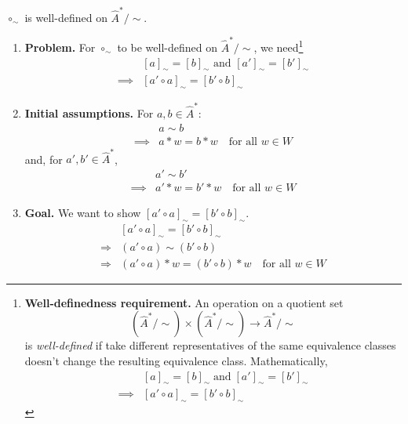 \begin{propositionE}
    \label{prp:circ_sim_well_defined}
    $\circ_{\sim}$ is well-defined on $\hat{A}^{*}/\sim$.
\end{propositionE}
\begin{proofE}
\begin{enumerate}
    \item \textbf{Problem.}
    For $\circ_{\sim}$ to be well-defined on $\hat{A}^{*}/\sim$, we need\footnote{
        \textbf{Well-definedness requirement.}
        An operation on a quotient set
        \begin{equation}
            (\hat{A}^{*}/\sim) \times (\hat{A}^{*}/\sim) \to \hat{A}^{*}/\sim
        \end{equation}
        is \emph{well-defined} if take different representatives of the same equivalence classes doesn't change the resulting equivalence class.
        Mathematically,
        \begin{equation}
        \begin{aligned}
            & [a]_{\sim} = [b]_{\sim} \; \text{and} \; [a']_{\sim} = [b']_{\sim} \\
            \implies & [a' \circ a]_{\sim} = [b' \circ b]_{\sim}
        \end{aligned}
        \end{equation}
    }
    \begin{equation}
    \begin{aligned}
        & [a]_{\sim} = [b]_{\sim} \text{ and } [a']_{\sim} = [b']_{\sim} \\
        \implies & [a' \circ a]_{\sim} = [b' \circ b]_{\sim}
    \end{aligned}
    \end{equation}

    \item \textbf{Initial assumptions.}
    For $a, b \in \hat{A}^{*}$:
    \begin{align}
        & a \sim b \\
        \implies & a \ast w = b \ast w \quad \text{for all } w \in W
    \end{align}
    and, for $a', b' \in \hat{A}^{*}$,
    \begin{align}
        & a' \sim b' \\
        \implies & a' \ast w = b' \ast w \quad \text{for all } w \in W
    \end{align}

    \item \textbf{Goal.}
    We want to show $[a' \circ a]_{\sim} = [b' \circ b]_{\sim}$.
    \begin{align}
                    & [a' \circ a]_{\sim} = [b' \circ b]_{\sim}                               \\
      \Rightarrow{} & (a' \circ a) \sim (b' \circ b)                                          \\
      \Rightarrow{} & (a' \circ a) \ast w = (b' \circ b) \ast w \quad \text{for all } w \in W
    \end{align}


\end{enumerate}
\end{proofE}
